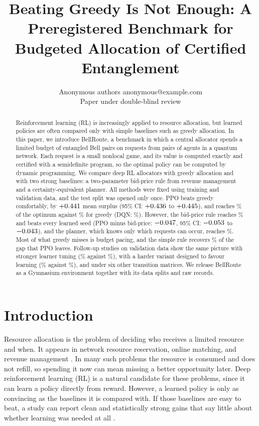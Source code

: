 \documentclass[10pt]{article}
\title{Beating Greedy Is Not Enough: A Preregistered Benchmark for Budgeted Allocation of Certified Entanglement}
\author{\name Anonymous authors \email anonymous@example.com \\
\addr Paper under double-blind review}
\newcommand{\bellroute}{BellRoute}
\begin{document}
\maketitle

\begin{abstract}
Reinforcement learning (RL) is increasingly applied to resource allocation, but learned policies are often compared only with simple baselines such as greedy allocation. In this paper, we introduce \bellroute{}, a benchmark in which a central allocator spends a limited budget of entangled Bell pairs on requests from pairs of agents in a quantum network. Each request is a small nonlocal game, and its value is computed exactly and certified with a semidefinite program, so the optimal policy can be computed by dynamic programming. We compare deep RL allocators with greedy allocation and with two strong baselines: a two-parameter bid-price rule from revenue management and a certainty-equivalent planner. All methods were fixed using training and validation data, and the test split was opened only once. PPO beats greedy comfortably, by $+0.441$ mean surplus (95\% CI: $+0.436$ to $+0.445$), and reaches \cfFracPpo\% of the optimum against \cfFracGreedy\% for greedy (DQN: \cfFracDqn\%). However, the bid-price rule reaches \cfFracBp\% and beats every learned seed (PPO minus bid-price: $-0.047$, 95\% CI: $-0.053$ to $-0.043$), and the planner, which knows only which requests can occur, reaches \cfFracCe\%. Most of what greedy misses is budget pacing, and the simple rule recovers \cfGapClosed\% of the gap that PPO leaves. Follow-up studies on validation data show the same picture with stronger learner tuning (\lsPPOFrac\% against \lsRuleFrac\%), with a harder variant designed to favour learning (\rgBestFrac\% against \rgRuleFrac\%), and under six other transition matrices. We release \bellroute{} as a Gymnasium environment together with its data splits and raw records.
\end{abstract}

\section{Introduction}\label{sec:intro}

Resource allocation is the problem of deciding who receives a limited resource and when. It appears in network resource reservation, online matching, and revenue management \citep{talluri2004theory,kleinberg2005multiple,feldman2009online}. In many such problems the resource is consumed and does not refill, so spending it now can mean missing a better opportunity later. Deep reinforcement learning (RL) is a natural candidate for these problems, since it can learn a policy directly from reward. However, a learned policy is only as convincing as the baselines it is compared with. If those baselines are easy to beat, a study can report clean and statistically strong gains that say little about whether learning was needed at all \citep{henderson2018deep,rajeswaran2017towards,mania2018simple,patterson2024empirical}.
\end{document}
